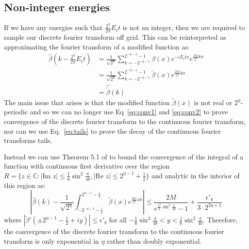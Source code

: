 \documentclass[aps,floatfix,10pt,amssymb,amsfont,amsmath,superscriptaddress,float,nofootinbib,longbibliography,nobalancelastpage,twocolumn]{revtex4-2}
\begin{document}
\subsection{Non-integer energies}
If we have any energies such that $\frac{2^{\eta}}{2\pi}E_it$ is not an integer, then we are required to sample our discrete fourier transform off grid. This can be reinterpreted as approximating the fourier transform of a modified function as:
\begin{align}
    \hat \beta(k -\frac{2^{\eta}}{2\pi}E_it) &= \frac{1}{\sqrt{2^{\eta}}} \sum_{k=-2^{-\eta-1}}^{2^{-\eta-1}-1} \beta(x) e^{-iE_it x}e^{\frac{2\pi i}{2^{\eta}} kx}\\
    &= \frac{1}{\sqrt{2^{\eta}}} \sum_{k=-2^{-\eta-1}}^{2^{-\eta-1}-1} \tilde\beta(x)e^{\frac{2\pi i}{2^{\eta}} kx}\\
    &= \hat{\tilde\beta}(k)
\end{align}
The main issue that arises is that the modified function $\tilde\beta(x)$ is not real or $2^{\eta}$-periodic and so we can no longer use Eq~\eqref{eq:conv1} and \eqref{eq:conv2} to prove convergence of the discrete fourier transform to the continuous fourier transform, nor can we use Eq.~\ref{eq:tails} to prove the decay of the continuous fourier transforms tails. 

Instead we can use Theorem 5.1 of \cite{javed2014trapezoidal} to bound the convergence of the integral of a function with continuous first derivative over the region $R = \{z \in \mathbb{C}: |\text{Im } z| \leq \frac{1}{6}\sin^2\frac{\pi}{4b}, |\text{Re } z| \leq 2^{\eta-1}+\frac{1}{2}\}$ and analytic in the interior of this region as:
\begin{equation}
    \left| \hat \beta(k) - \frac{1}{\sqrt{2^{\eta}}} \int_{-2^{-\eta-1}-\frac{1}{2}}^{2^{\eta-1}-\frac{1}{2}}\tilde\beta(x)e^{\frac{2\pi i}{2^{\eta}}xk} \right| \leq \frac{2M}{e^{\frac{2^{\eta}}{6}\sin^2 \frac{\pi}{4b}}-1} + \frac{\epsilon'_{b}}{3\cdot 2^{2\eta + 1}}
\end{equation}
where $|\tilde\beta'(\pm2^{\eta-1}-\frac{1}{2}+iy)| \leq \epsilon'_{b}$ for all $-\frac{1}{6}\sin^2\frac{\pi}{4b}<y<\frac{1}{6}\sin^2\frac{\pi}{4b}$. Therefore, the convergence of the discrete fourier transform to the continuous fourier transform is only exponential in $\eta$ rather than doubly exponential.
\end{document}
